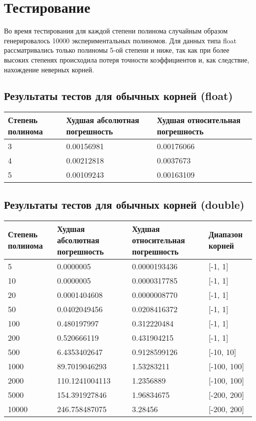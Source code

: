 \documentclass[a4paper,12pt]{article}
\begin{document}
\section{Тестирование}
Во время тестирования для каждой степени полинома случайным образом генерировалось 10000 экспериментальных полиномов. Для данных типа float рассматривались только полиномы 5-ой степени и ниже, так как при более высоких степенях происходила потеря точности коэффициентов и, как следствие, нахождение неверных корней.

\subsection{Результаты тестов для обычных корней (float)}
\begin{center}
  \begin{tabular}{|p{4.5cm}|p{5.5cm}|p{5.5cm}|}
  \hline
  \textbf{Степень полинома}  &  \textbf{Худшая абсолютная погрешность} & \textbf{Худшая относительная погрешность} \\
  \hline
  3 & 0.00156981 & 0.00176066 \\
  \hline
  4 & 0.00212818 & 0.0037673 \\
  \hline
  5 & 0.00109243 & 0.00163109 \\
  \hline
\end{tabular}
\label{tab:my_label_2}
\end{center}

\subsection{Результаты тестов для обычных корней (double)}
\begin{center}
  \begin{tabular}{|p{4.0cm}|p{4.0cm}|p{4.0cm}|p{3.0cm}|}
  \hline
  \textbf{Степень полинома}  &  \textbf{Худшая абсолютная погрешность} & \textbf{Худшая относительная погрешность} & \textbf{Диапазон корней}\\
  \hline
  5 & 0.0000005 & 0.0000193436 & [-1, 1]\\
  \hline
  10 & 0.0000005 & 0.0000317785 & [-1, 1]\\
  \hline
  20 & 0.0001404608 & 0.0000008770 & [-1, 1] \\
  \hline
  50 & 0.0402049456 & 0.0208416372 & [-1, 1] \\
  \hline
  100 & 0.480197997 & 0.312220484 & [-1, 1] \\
  \hline
  200 & 0.520666119 & 0.431904215 & [-1, 1] \\
  \hline
  500 & 6.4353402647 & 0.9128599126 & [-10, 10] \\
  \hline
  1000 & 89.7019046293 & 1.53283211 & [-100, 100] \\
  \hline
  2000 & 110.1241004113 & 1.2356889 & [-100, 100] \\
  \hline
  5000 & 154.391927846 & 1.96834675 & [-200, 200] \\
  \hline
  10000 & 246.758487075 & 3.28456 & [-200, 200] \\
  \hline
\end{tabular}
\label{tab:my_label_2}
\end{center}
\end{document}
